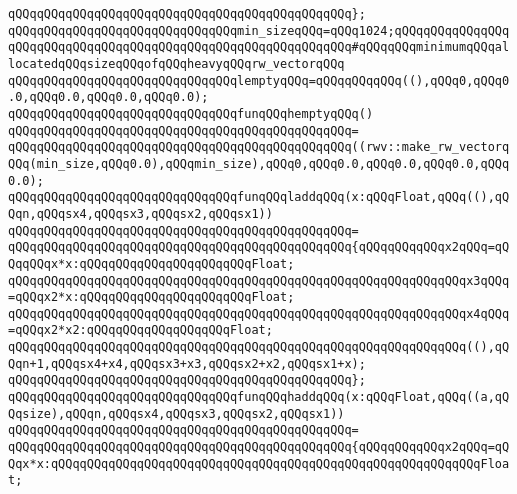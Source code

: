 \verb|qQQqqQQqqQQqqQQqqQQqqQQqqQQqqQQqqQQqqQQqqQQqqQQq};|\newline
\newline
\verb|qQQqqQQqqQQqqQQqqQQqqQQqqQQqqQQqmin_sizeqQQq=qQQq1024;qQQqqQQqqQQqqQQqqQQqqQQqqQQqqQQqqQQqqQQqqQQqqQQqqQQqqQQqqQQqqQQq#qQQqqQQqminimumqQQqallocatedqQQqsizeqQQqofqQQqheavyqQQqrw_vectorqQQq|\newline
\newline
\verb|qQQqqQQqqQQqqQQqqQQqqQQqqQQqqQQqlemptyqQQq=qQQqqQQqqQQq((),qQQq0,qQQq0.0,qQQq0.0,qQQq0.0,qQQq0.0);|\newline
\newline
\verb|qQQqqQQqqQQqqQQqqQQqqQQqqQQqqQQqfunqQQqhemptyqQQq()|\newline
\verb|qQQqqQQqqQQqqQQqqQQqqQQqqQQqqQQqqQQqqQQqqQQqqQQq=|\newline
\verb|qQQqqQQqqQQqqQQqqQQqqQQqqQQqqQQqqQQqqQQqqQQqqQQq((rwv::make_rw_vectorqQQq(min_size,qQQq0.0),qQQqmin_size),qQQq0,qQQq0.0,qQQq0.0,qQQq0.0,qQQq0.0);|\newline
\newline
\verb|qQQqqQQqqQQqqQQqqQQqqQQqqQQqqQQqfunqQQqladdqQQq(x:qQQqFloat,qQQq((),qQQqn,qQQqsx4,qQQqsx3,qQQqsx2,qQQqsx1))|\newline
\verb|qQQqqQQqqQQqqQQqqQQqqQQqqQQqqQQqqQQqqQQqqQQqqQQq=|\newline
\verb|qQQqqQQqqQQqqQQqqQQqqQQqqQQqqQQqqQQqqQQqqQQqqQQq{qQQqqQQqqQQqx2qQQq=qQQqqQQqx*x:qQQqqQQqqQQqqQQqqQQqqQQqFloat;|\newline
\verb|qQQqqQQqqQQqqQQqqQQqqQQqqQQqqQQqqQQqqQQqqQQqqQQqqQQqqQQqqQQqqQQqx3qQQq=qQQqx2*x:qQQqqQQqqQQqqQQqqQQqqQQqFloat;|\newline
\verb|qQQqqQQqqQQqqQQqqQQqqQQqqQQqqQQqqQQqqQQqqQQqqQQqqQQqqQQqqQQqqQQqx4qQQq=qQQqx2*x2:qQQqqQQqqQQqqQQqqQQqFloat;|\newline
\newline
\verb|qQQqqQQqqQQqqQQqqQQqqQQqqQQqqQQqqQQqqQQqqQQqqQQqqQQqqQQqqQQqqQQq((),qQQqn+1,qQQqsx4+x4,qQQqsx3+x3,qQQqsx2+x2,qQQqsx1+x);|\newline
\verb|qQQqqQQqqQQqqQQqqQQqqQQqqQQqqQQqqQQqqQQqqQQqqQQq};|\newline
\newline
\verb|qQQqqQQqqQQqqQQqqQQqqQQqqQQqqQQqfunqQQqhaddqQQq(x:qQQqFloat,qQQq((a,qQQqsize),qQQqn,qQQqsx4,qQQqsx3,qQQqsx2,qQQqsx1))|\newline
\verb|qQQqqQQqqQQqqQQqqQQqqQQqqQQqqQQqqQQqqQQqqQQqqQQq=|\newline
\verb|qQQqqQQqqQQqqQQqqQQqqQQqqQQqqQQqqQQqqQQqqQQqqQQq{qQQqqQQqqQQqx2qQQq=qQQqx*x:qQQqqQQqqQQqqQQqqQQqqQQqqQQqqQQqqQQqqQQqqQQqqQQqqQQqqQQqqQQqFloat;|\newline
